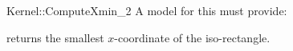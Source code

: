 \begin{ccRefFunctionObjectConcept}{Kernel::ComputeXmin_2}
A model for this must provide:


       {returns the smallest $x$-coordinate of the iso-rectangle.}


\ccRefines
{}



\end{ccRefFunctionObjectConcept}
